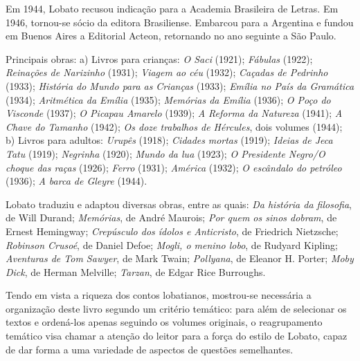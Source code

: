 \documentclass[11pt]{extarticle}
\begin{document}
Em 1944, Lobato recusou indicação para a Academia Brasileira de Letras.
Em 1946, tornou-se sócio da editora Brasiliense. Embarcou para a
Argentina e fundou em Buenos Aires a Editorial Acteon, retornando no ano
seguinte a São Paulo.

Principais obras: a) Livros para crianças: \emph{O Saci} (1921);
\emph{Fábulas} (1922); \emph{Reinações de Narizinho} (1931);
\emph{Viagem ao céu} (1932); \emph{Caçadas de Pedrinho} (1933);
\emph{História do Mundo para as} \emph{Crianças} (1933); \emph{Emília no
País da Gramática} (1934); \emph{Aritmética da Emília} (1935);
\emph{Memórias da Emília} (1936); \emph{O Poço do Visconde} (1937);
\emph{O Picapau Amarelo} (1939); \emph{A Reforma da Natureza} (1941);
\emph{A Chave do Tamanho} (1942); \emph{Os doze trabalhos de Hércules},
dois volumes (1944); b) Livros para adultos: \emph{Urupês} (1918);
\emph{Cidades} \emph{mortas} (1919); \emph{Ideias de Jeca Tatu} (1919);
\emph{Negrinha} (1920); \emph{Mundo da lua} (1923); \emph{O Presidente
Negro/O choque das raças} (1926); \emph{Ferro} (1931); \emph{América}
(1932); \emph{O escândalo do petróleo} (1936); \emph{A barca de Gleyre}
(1944).


Lobato traduziu e adaptou diversas obras, entre as quais: \emph{Da
história da filosofia}, de Will Durand; \emph{Memórias}, de André
Maurois; \emph{Por quem os sinos dobram}, de Ernest Hemingway;
\emph{Crepúsculo dos ídolos e Anticristo}, de Friedrich Nietzsche;
\emph{Robinson Crusoé}, de Daniel Defoe; \emph{Mogli, o menino lobo}, de
Rudyard Kipling; \emph{Aventuras de Tom Sawyer}, de Mark Twain;
\emph{Pollyana}, de Eleanor H. Porter; \emph{Moby Dick}, de Herman
Melville; \emph{Tarzan}, de Edgar Rice Burroughs.


Tendo em vista a riqueza dos contos lobatianos, mostrou-se necessária a
organização deste livro segundo um critério temático: para além de
selecionar os textos e ordená-los apenas seguindo os volumes originais,
o reagrupamento temático visa chamar a atenção do leitor para a força
do estilo de Lobato, capaz de dar forma a uma variedade de aspectos de
questões semelhantes.
\end{document}
